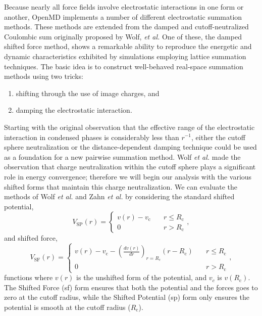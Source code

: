 \documentclass[]{book}
\begin{document}
Because nearly all force fields involve electrostatic interactions in
one form or another, OpenMD implements a number of different
electrostatic summation methods.  These methods are extended from the
damped and cutoff-neutralized Coulombic sum originally proposed by
Wolf, {\it et al.}\cite{Wolf99} One of these, the damped shifted force
method, shows a remarkable ability to reproduce the energetic and
dynamic characteristics exhibited by simulations employing lattice
summation techniques.  The basic idea is to construct well-behaved
real-space summation methods using two tricks:
\begin{enumerate}
\item shifting through the use of image charges, and 
\item damping the electrostatic interaction.
\end{enumerate} 
Starting with the original observation that the effective range of the
electrostatic interaction in condensed phases is considerably less
than $r^{-1}$, either the cutoff sphere neutralization or the
distance-dependent damping technique could be used as a foundation for
a new pairwise summation method.  Wolf \textit{et al.} made the
observation that charge neutralization within the cutoff sphere plays
a significant role in energy convergence; therefore we will begin our
analysis with the various shifted forms that maintain this charge
neutralization.  We can evaluate the methods of Wolf
\textit{et al.}  and Zahn \textit{et al.} by considering the standard
shifted potential,
\begin{equation}
V_\textrm{SP}(r) =      \begin{cases}
v(r)-v_\textrm{c} &\quad r\leqslant R_\textrm{c} \\ 0 &\quad r >
R_\textrm{c}  
\end{cases},
\label{eq:shiftingPotForm}
\end{equation}
and shifted force,
\begin{equation}
V_\textrm{SF}(r) =      \begin{cases}
v(r)-v_\textrm{c}-\left(\frac{d v(r)}{d r}\right)_{r=R_\textrm{c}}(r-R_\textrm{c
})
&\quad r\leqslant R_\textrm{c} \\ 0 &\quad r > R_\textrm{c} 
                                                \end{cases},
\label{eq:shiftingForm}
\end{equation}
functions where $v(r)$ is the unshifted form of the potential, and
$v_c$ is $v(R_\textrm{c})$.  The Shifted Force ({\sc sf}) form ensures
that both the potential and the forces goes to zero at the cutoff
radius, while the Shifted Potential ({\sc sp}) form only ensures the
potential is smooth at the cutoff radius
($R_\textrm{c}$).\cite{Allen87}
\end{document}
